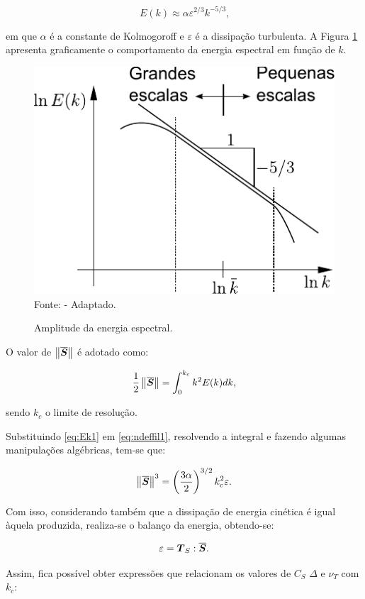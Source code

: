 \begin{equation}
    E(k)\approx\alpha\varepsilon^{2/3}k^{-5/3}\text{,}\label{eq:Ek1}
\end{equation}

\noindent em que $\alpha$ é a constante de Kolmogoroff e $\varepsilon$ é a dissipação turbulenta. A Figura \ref{fig:EnergiaEspectral} apresenta graficamente o comportamento da energia espectral em função de $k$.

\begin{figure}[h!]
    \centering
    \caption{Amplitude da energia espectral.}
    \includegraphics[width=0.4\linewidth]{Figuras/EnergiaEspectral.pdf}
    \\Fonte: \cite{hughes2000large} - Adaptado.
    \label{fig:EnergiaEspectral}
\end{figure}

O valor de $\left\lVert{\overline{\boldsymbol{S}}}\right\lVert$ é adotado como:

\begin{equation}
    \frac{1}{2}\left\lVert{\overline{\boldsymbol{S}}}\right\lVert=\int_0^{k_c}{k^2E(k)dk}\text{,}\label{eq:ndeffil1}
\end{equation}

\noindent sendo $k_c$ o limite de resolução.

Substituindo \eqref{eq:Ek1} em \eqref{eq:ndeffil1}, resolvendo a integral e fazendo algumas manipulações algébricas, tem-se que:

\begin{equation}
    \left\lVert{\overline{\boldsymbol{S}}}\right\lVert^3=\left({\frac{3\alpha}{2}}\right)^{3/2}k_c^2\varepsilon\text{.}
\end{equation}

Com isso, considerando também que a dissipação de energia cinética é igual àquela produzida, realiza-se o balanço da energia, obtendo-se:

\begin{equation}
    \varepsilon=\boldsymbol{T}_S:\overline{\boldsymbol{S}}\text{.}
\end{equation}

\noindent Assim, fica possível obter expressões que relacionam os valores de $C_S$ $\Delta$ e $\nu_T$ com $k_c$:

